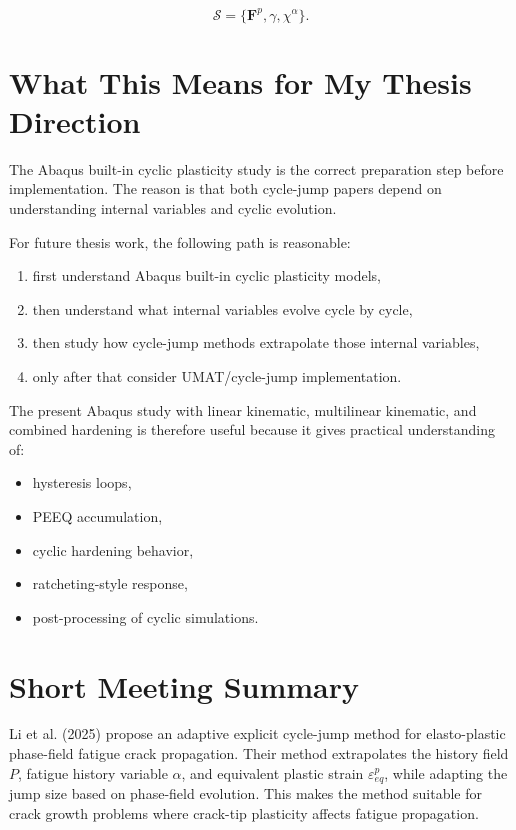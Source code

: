 \documentclass[11pt,a4paper]{article}
\begin{document}
\[
\mathcal{S}
=
\{\bm{F}^p,\gamma,\chi^{\alpha}\}.
\]

\section{What This Means for My Thesis Direction}

The Abaqus built-in cyclic plasticity study is the correct preparation step before implementation. The reason is that both cycle-jump papers depend on understanding internal variables and cyclic evolution.

For future thesis work, the following path is reasonable:

\begin{enumerate}
    \item first understand Abaqus built-in cyclic plasticity models,
    \item then understand what internal variables evolve cycle by cycle,
    \item then study how cycle-jump methods extrapolate those internal variables,
    \item only after that consider UMAT/cycle-jump implementation.
\end{enumerate}

The present Abaqus study with linear kinematic, multilinear kinematic, and combined hardening is therefore useful because it gives practical understanding of:

\begin{itemize}
    \item hysteresis loops,
    \item PEEQ accumulation,
    \item cyclic hardening behavior,
    \item ratcheting-style response,
    \item post-processing of cyclic simulations.
\end{itemize}

\section{Short Meeting Summary}

Li et al. (2025) propose an adaptive explicit cycle-jump method for elasto-plastic phase-field fatigue crack propagation. Their method extrapolates the history field $P$, fatigue history variable $\alpha$, and equivalent plastic strain $\varepsilon_{eq}^p$, while adapting the jump size based on phase-field evolution. This makes the method suitable for crack growth problems where crack-tip plasticity affects fatigue propagation.
\end{document}
